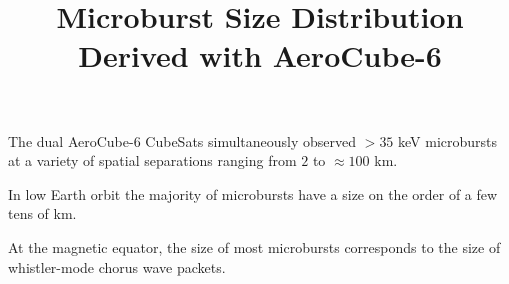 \documentclass[draft]{agujournal2019}
\begin{document}
\title{Microburst Size Distribution Derived with AeroCube-6}

%
%





\begin{keypoints}
\item The dual AeroCube-6 CubeSats simultaneously observed $> 35$ keV microbursts at a variety of spatial separations ranging from $2$ to $\approx 100$ km.
\item In low Earth orbit the majority of microbursts have a size on the order of a few tens of km.
\item At the magnetic equator, the size of most microbursts corresponds to the size of whistler-mode chorus wave packets.
\end{keypoints}

%
%

\end{document}
